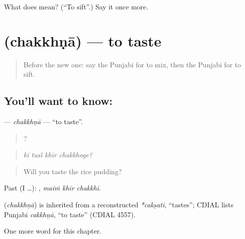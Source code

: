 \begin{tcolorbox}[breakable,colback=teal!4,colframe=teal!35!black,title={Before you move on}]
What does  mean? (\textquotedblleft{}To sift\textquotedblright{}.) Say it once more.
\end{tcolorbox}
\section[\texorpdfstring{\pa{ਚੱਖਣਾ} (chakkhṇā)}{ਚੱਖਣਾ (chakkhṇā)}]{ (chakkhṇā) — to taste}

\label{lesson:PA-C243-chakkhna}



\begin{quote}
Before the new one: say the Punjabi for to mix, then the Punjabi for to sift.
\end{quote}

\subsection*{You'll want to know: }
\textbf{} — \emph{chakkhṇā} — \textquotedblleft{}to taste\textquotedblright{}.

\begin{quote}
   ?
\end{quote}

\begin{quote}
\emph{kī tusī̃ khīr chakkhoge?}
\end{quote}

\begin{quote}
Will you taste the rice pudding?
\end{quote}

Past (I …):   , \emph{maiṁ khīr chakkhī}.

\begin{cousinweb}
\textbf{} (\emph{chakkhṇā}) is inherited from a reconstructed \emph{*cakṣati}, \textquotedblleft{}tastes\textquotedblright{}; CDIAL lists Punjabi \emph{cakkhṇā}, \textquotedblleft{}to taste\textquotedblright{} (CDIAL 4557).
\end{cousinweb}

\begin{grammarlens}[title={What you've built}]
One more word for this chapter.
\end{grammarlens}

